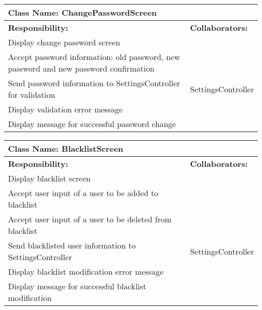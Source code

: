 \documentclass[english]{article}
\begin{document}
    \begin{table}[!ht]
        \centering
        \begin{tabular}{|p{8cm}|p{4cm}|}
        \hline 
        \multicolumn{2}{|l|}{\textbf{Class Name: ChangePasswordScreen}} \\
        \hline
        \textbf{Responsibility:} & \textbf{Collaborators:} \\
        \hline
        Display change password screen & \\
        \hline
        Accept password information: old password, new password and new password confirmation & \\
        \hline
        Send password information to SettingsController for validation & SettingsController \\
        \hline
        Display validation error message & \\
        \hline
        Display message for successful password change & \\
        \hline
        \end{tabular}
    \end{table}
    
    \begin{table}[!ht]
        \centering
        \begin{tabular}{|p{8cm}|p{4cm}|}
        \hline 
        \multicolumn{2}{|l|}{\textbf{Class Name: BlacklistScreen}} \\
        \hline
        \textbf{Responsibility:} & \textbf{Collaborators:} \\
        \hline
        Display blacklist screen &  \\
        \hline
        Accept user input of a user to be added to blacklist & \\
        \hline
        Accept user input of a user to be deleted from blacklist & \\
        \hline
        Send blacklisted user information to SettingsController & SettingsController\\
        \hline
        Display blacklist modification error message & \\
        \hline
        Display message for successful blacklist modification & \\
        \hline
        \end{tabular}
    \end{table}
    
\end{document}

